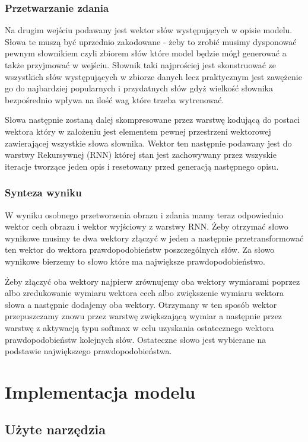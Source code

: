 \subsubsection{Przetwarzanie zdania}
Na drugim wejściu podawany jest wektor słów występujących w opisie modelu. Słowa te muszą być uprzednio zakodowane - żeby to zrobić musimy dysponować pewnym słownikiem czyli zbiorem słów które model będzie mógł generować a także przyjmować w wejściu. Słownik taki najprościej jest skonstruować ze wszystkich słów występujących w zbiorze danych lecz praktycznym jest zawężenie go do najbardziej popularnych i przydatnych słów gdyż wielkość słownika bezpośrednio wpływa na ilość wag które trzeba wytrenować.

Słowa następnie zostaną dalej skompresowane przez warstwę kodującą do postaci wektora który w założeniu jest elementem pewnej przestrzeni wektorowej zawierającej wszystkie słowa słownika. Wektor ten następnie podawany jest do warstwy Rekursywnej (RNN) której stan jest zachowywany przez wszyskie iteracje tworzące jeden opis i resetowany przed generacją następnego opisu.
\subsubsection{Synteza wyniku}
W wyniku osobnego przetworzenia obrazu i zdania mamy teraz odpowiednio wektor cech obrazu i wektor wyjściowy z warstwy RNN. Żeby otrzymać słowo wynikowe musimy te dwa wektory złączyć w jeden a następnie przetransformować ten wektor do wektora prawdopodobieństw poszczególnych słów. Za słowo wynikowe bierzemy to słowo które ma największe prawdopodobieństwo.

Żeby złączyć oba wektory najpierw zrównujemy oba wektory wymiarami poprzez albo zredukowanie wymiaru wektora cech albo zwiększenie wymiaru wektora słowa a następnie dodajemy oba wektory. Otrzymany w ten sposób wektor przepuszczamy znowu przez warstwę zwiększającą wymiar a następnie przez warstwę z aktywacją typu softmax w celu uzyskania ostatecznego wektora prawdopodobieństw kolejnych słów. Ostateczne słowo jest wybierane na podstawie największego prawdopodobieństwa.

\section{Implementacja modelu}
\subsection{Użyte narzędzia}
